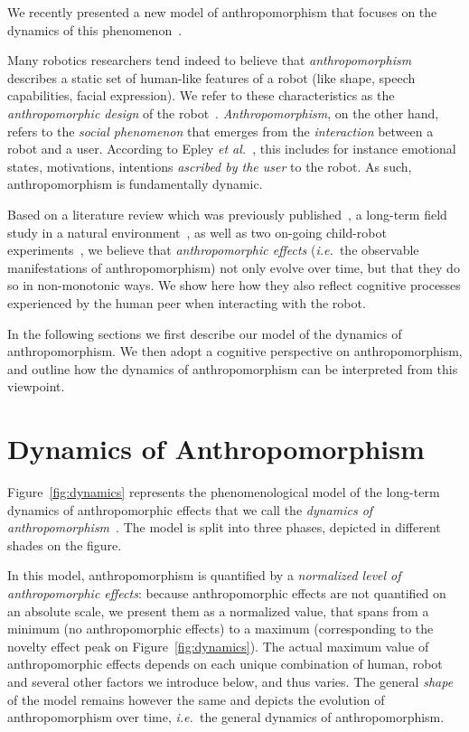 \documentclass{sig-alternate-2013}
\newcommand{\etal}{{\textit{et al.~}}}
\newcommand{\ie}{{\textit{i.e.~}}}
\begin{document}
We recently presented a new model of anthropomorphism that focuses on the
dynamics of this phenomenon~\cite{lemaignan2014dynamics}.

Many robotics researchers tend indeed to believe that \emph{anthropomorphism}
describes a static set of human-like features of a robot (like shape, speech
capabilities, facial expression). We refer to these characteristics as the
\emph{anthropomorphic design} of the robot~\cite{fink_anthropomorphism_2012}.
\emph{Anthropomorphism}, on the other hand, refers to the \emph{social
phenomenon} that emerges from the \emph{interaction} between a robot and a
user. According to Epley \etal\cite{epley_when_2008}, this includes for
instance emotional states, motivations, intentions \emph{ascribed by the user}
to the robot. As such, anthropomorphism is fundamentally dynamic.

Based on a literature review which was previously
published~\cite{fink_anthropomorphism_2012}, a long-term field study in a
natural environment~\cite{fink_living_2013}, as well as two on-going child-robot
experiments~\cite{fink2014which}, we believe that \emph{anthropomorphic effects}
(\ie the observable manifestations of anthropomorphism) not only evolve over
time, but that they do so in non-monotonic ways. We show here how they also reflect cognitive
processes experienced by the human peer when interacting with the robot.

In the following sections we first describe our model of the dynamics of
anthropomorphism.  We then adopt a cognitive perspective on anthropomorphism,
and outline how the dynamics of anthropomorphism can be interpreted from this
viewpoint. 


\section{Dynamics of Anthropomorphism}
\label{sec:dynamics_model}

Figure~\ref{fig:dynamics} represents the phenomenological model of the long-term
dynamics of anthropomorphic effects that we call the \emph{dynamics of
anthropomorphism}~\cite{lemaignan2014dynamics}. The model is split into three
phases, depicted in different shades on the figure.

In this model, anthropomorphism is quantified by a \emph{normalized level of
anthropomorphic effects}: because anthropomorphic effects are not quantified on
an absolute scale, we present them as a normalized value, that spans from a
minimum (no anthropomorphic effects) to a maximum (corresponding to the novelty
effect peak on Figure~\ref{fig:dynamics}). The actual maximum value of
anthropomorphic effects depends on each unique combination of human, robot and
several other factors we introduce below, and thus varies. The general
\emph{shape} of the model remains however the same and depicts the evolution of
anthropomorphism over time, \ie the general dynamics of anthropomorphism.
\end{document}
